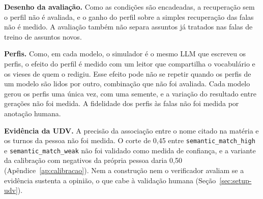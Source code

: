 \textbf{Desenho da avaliação.} Como as condições são encadeadas, a recuperação sem o perfil não é
avaliada, e o ganho do perfil sobre a simples recuperação das falas não é medido. A avaliação
também não separa assuntos já tratados nas falas de treino de assuntos novos.

\textbf{Perfis.} Como, em cada modelo, o simulador é o mesmo LLM que escreveu os perfis, o efeito do
perfil é medido com um leitor que compartilha o vocabulário e os vieses de quem o redigiu. Esse
efeito pode não se repetir quando os perfis de um modelo são lidos por outro, combinação que não foi
avaliada. Cada modelo gerou os perfis uma única vez, com uma semente, e a variação do resultado entre
gerações não foi medida. A fidelidade dos perfis às falas não foi medida por anotação humana.

\textbf{Evidência da UDV.} A precisão da associação entre o nome citado na matéria e os turnos da
pessoa não foi medida. O corte de 0,45 entre \texttt{semantic\_match\_high} e
\texttt{semantic\_match\_weak} não foi validado como medida de confiança, e a variante da calibração
com negativos da própria pessoa daria 0,50 (Apêndice~\ref{ap:calibracao}). Nem a construção nem o
verificador avaliam se a evidência sustenta a opinião, o que cabe à validação humana
(Seção~\ref{sec:setup-udv}).
